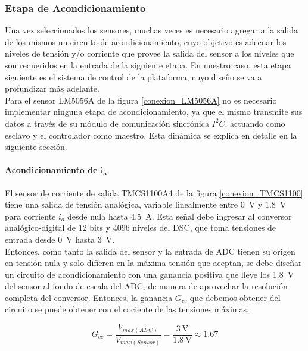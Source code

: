 \subsubsection{Etapa de Acondicionamiento}

Una vez seleccionados los sensores, muchas veces es necesario agregar a la salida de los mismos un circuito de acondicionamiento, cuyo objetivo es adecuar los niveles de tensión y/o corriente que provee la salida del sensor a los niveles que son requeridos en la entrada de la siguiente etapa. En nuestro caso, esta etapa siguiente es el sistema de control de la plataforma, cuyo diseño se va a profundizar más adelante.\\

Para el sensor LM5056A de la figura \ref{conexion_LM5056A} no es necesario implementar ninguna etapa de acondicionamiento, ya que el mismo transmite sus datos a través de su módulo de comunicación sincrónica $I^2C$, actuando como esclavo y el controlador como maestro. Esta dinámica se explica en detalle en la siguiente sección.\\

\paragraph{Acondicionamiento de $\mathbf{i_o}$}

El sensor de corriente de salida TMCS1100A4 de la figura \ref{conexion_TMCS1100} tiene una salida de tensión analógica, variable linealmente entre \SI[]{0}[]{\volt} y \SI[]{1.8}[]{\volt} para corriente $i_o$ desde nula hasta \SI[]{4.5}[]{\ampere}. Esta señal debe ingresar al conversor analógico-digital de \num{12} bits y \num{4096} niveles del DSC, que toma tensiones de entrada desde \SI[]{0}[]{\volt} hasta \SI[]{3}[]{\volt}.\\

Entonces, como tanto la salida del sensor y la entrada de ADC tienen su origen en tensión nula y solo difieren en la máxima tensión que aceptan, se debe diseñar un circuito de acondicionamiento con una {\Medium ganancia positiva} que lleve los \SI[]{1.8}[]{\volt} del sensor al fondo de escala del ADC, de manera de aprovechar la resolución completa del conversor. Entonces, la ganancia $G_{cc}$ que debemos obtener del circuito se puede obtener con el cociente de las tensiones máximas.

\begin{equation}\label{ganancia_acond}
    G_{cc} = \frac{V_{max(ADC)}}{V_{max(Sensor)}} = \frac{\SI{3}{\volt}}{\SI{1.8}{\volt}} \approx 1.67
\end{equation}


